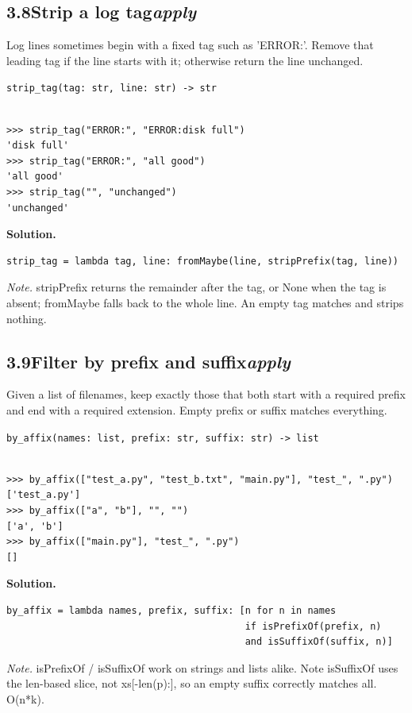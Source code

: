 \documentclass[10pt,letterpaper]{book}
\begin{document}
\subsection*{3.8\quad Strip a log tag\hfill\textnormal{\textit{apply}}}
Log lines sometimes begin with a fixed tag such as 'ERROR:'. Remove that leading tag if the line starts with it; otherwise return the line unchanged.

\noindent\texttt{strip\_tag(tag: str, line: str) -> str}
\begin{lstlisting}[style=ex]

>>> strip_tag("ERROR:", "ERROR:disk full")
'disk full'
>>> strip_tag("ERROR:", "all good")
'all good'
>>> strip_tag("", "unchanged")
'unchanged'

\end{lstlisting}
\noindent\textbf{Solution.}
\begin{lstlisting}[style=code]
strip_tag = lambda tag, line: fromMaybe(line, stripPrefix(tag, line))
\end{lstlisting}
\noindent\textit{Note.} stripPrefix returns the remainder after the tag, or None when the tag is absent; fromMaybe falls back to the whole line. An empty tag matches and strips nothing.

\subsection*{3.9\quad Filter by prefix and suffix\hfill\textnormal{\textit{apply}}}
Given a list of filenames, keep exactly those that both start with a required prefix and end with a required extension. Empty prefix or suffix matches everything.

\noindent\texttt{by\_affix(names: list, prefix: str, suffix: str) -> list}
\begin{lstlisting}[style=ex]

>>> by_affix(["test_a.py", "test_b.txt", "main.py"], "test_", ".py")
['test_a.py']
>>> by_affix(["a", "b"], "", "")
['a', 'b']
>>> by_affix(["main.py"], "test_", ".py")
[]

\end{lstlisting}
\noindent\textbf{Solution.}
\begin{lstlisting}[style=code]
by_affix = lambda names, prefix, suffix: [n for n in names
                                          if isPrefixOf(prefix, n)
                                          and isSuffixOf(suffix, n)]
\end{lstlisting}
\noindent\textit{Note.} isPrefixOf / isSuffixOf work on strings and lists alike. Note isSuffixOf uses the len-based slice, not xs[-len(p):], so an empty suffix correctly matches all. O(n*k).
\end{document}
